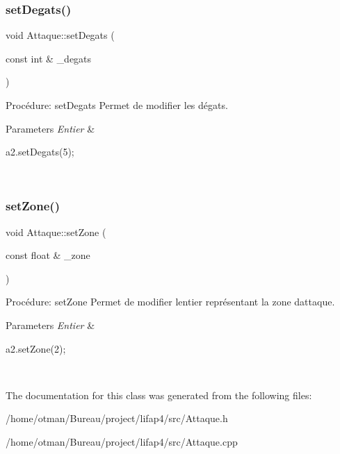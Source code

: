 \subsubsection{\texorpdfstring{set\+Degats()}{setDegats()}}
{\footnotesize\ttfamily void Attaque\+::set\+Degats (\begin{DoxyParamCaption}\item[{const int \&}]{\+\_\+degats }\end{DoxyParamCaption})}



Procédure\+: set\+Degats Permet de modifier les dégats. 


\begin{DoxyParams}{Parameters}
{\em Entier} & 
\begin{DoxyCode}
a2.setDegats(5);
\end{DoxyCode}
 \\
\hline
\end{DoxyParams}
\mbox{\label{classAttaque_ae6dc5afd850f4518e937b8a2c08ac764}} 
\subsubsection{\texorpdfstring{set\+Zone()}{setZone()}}
{\footnotesize\ttfamily void Attaque\+::set\+Zone (\begin{DoxyParamCaption}\item[{const float \&}]{\+\_\+zone }\end{DoxyParamCaption})}



Procédure\+: set\+Zone Permet de modifier l\textquotesingle{}entier représentant la zone d\textquotesingle{}attaque. 


\begin{DoxyParams}{Parameters}
{\em Entier} & 
\begin{DoxyCode}
a2.setZone(2);
\end{DoxyCode}
 \\
\hline
\end{DoxyParams}


The documentation for this class was generated from the following files\+:\begin{DoxyCompactItemize}
\item 
/home/otman/\+Bureau/project/lifap4/src/Attaque.\+h\item 
/home/otman/\+Bureau/project/lifap4/src/Attaque.\+cpp\end{DoxyCompactItemize}
